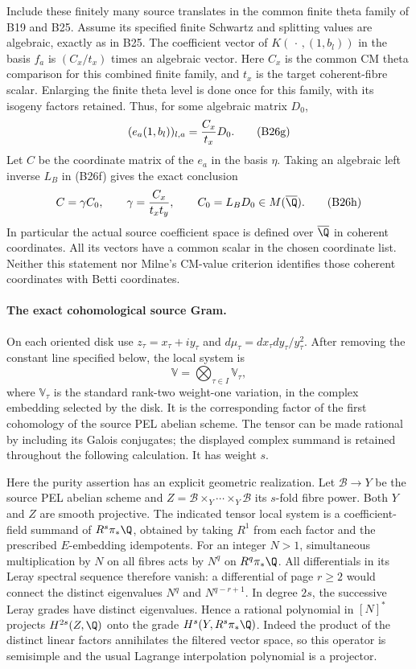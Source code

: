 Include these finitely many source translates in the common
finite theta family of B19 and B25.  Assume its specified
finite Schwartz and splitting values are algebraic, exactly
as in B25.  The coefficient vector of
$K(\,\cdot\,,(1,b_l))$ in the basis $f_a$ is
$(C_x/t_x)$ times an algebraic vector.  Here $C_x$ is the
common CM theta comparison for this combined finite family,
and $t_x$ is the target coherent-fibre scalar.  Enlarging the
finite theta level is done once for this family, with its
isogeny factors retained.  Thus, for some algebraic matrix $D_0$,
\[
                    (e_a(1,b_l))_{l,a}
                         ={C_x\over t_x}D_0.
 \tag{B26g}
\]
Let $C$ be the coordinate matrix of the $e_a$ in the basis
$\eta$.  Taking an algebraic left inverse $L_B$ in (B26f)
gives the exact conclusion
\[
              C=\gamma C_0,\qquad
              \gamma={C_x\over t_x t_y},\qquad
                    C_0=L_BD_0\in M(\overline\Q).
 \tag{B26h}
\]
In particular the actual source coefficient space is defined
over $\overline\Q$ in coherent coordinates.  All its vectors
have a common scalar in the chosen coordinate list.  Neither
this statement nor Milne's CM-value criterion identifies
those coherent coordinates with Betti coordinates.

\paragraph{The exact cohomological source Gram.}
On each oriented disk use $z_\tau=x_\tau+iy_\tau$ and
$d\mu_\tau=dx_\tau dy_\tau/y_\tau^2$.  After removing the
constant line specified below, the local system is
\[
                     \mathbb V=
               \bigotimes_{\tau\in I}\mathbb V_\tau,
 \tag{B26i}
\]
where $\mathbb V_\tau$ is the standard rank-two weight-one
variation, in the complex embedding selected by the disk.
It is the corresponding factor of the first cohomology of
the source PEL abelian scheme.  The tensor can be made rational
by including its Galois conjugates; the displayed complex
summand is retained throughout the following calculation.
It has weight $s$.

Here the purity assertion has an explicit geometric
realization.  Let $\mathcal B\to Y$ be the source PEL
abelian scheme and $Z=\mathcal B\times_Y\cdots\times_Y
\mathcal B$ its $s$-fold fibre power.  Both $Y$ and $Z$
are smooth projective.  The indicated tensor local
system is a coefficient-field summand of
$R^s\pi_*\Q$, obtained by taking $R^1$ from each
factor and the prescribed $E$-embedding idempotents.
For an integer $N>1$, simultaneous multiplication
by $N$ on all fibres acts by $N^q$ on $R^q\pi_*\Q$.
All differentials in its Leray spectral sequence
therefore vanish: a differential of page $r\ge2$
would connect the distinct eigenvalues $N^q$ and
$N^{q-r+1}$.  In degree $2s$, the successive Leray
grades have distinct eigenvalues.  Hence a rational
polynomial in $[N]^*$ projects $H^{2s}(Z,\Q)$ onto
the grade $H^s(Y,R^s\pi_*\Q)$.  Indeed the product
of the distinct linear factors annihilates the
filtered vector space, so this operator is
semisimple and the usual Lagrange interpolation
polynomial is a projector.

